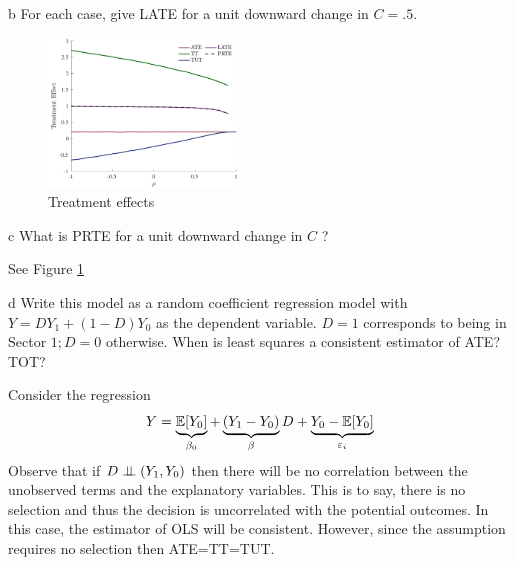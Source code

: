 \documentclass{article}
\begin{document}
\begin{problem}{b}
For each case, give LATE for a unit downward change in $C=.5$.
\end{problem}
\begin{solution}
\begin{figure}[htb]
    \centering
    \includegraphics[width=0.45\textwidth]{ps1Heckman/Figures/treatments.pdf}
    \caption{Treatment effects}
    \label{ps1H:q4:fig2}
\end{figure}\end{solution}
\begin{problem}{c}
What is PRTE for a unit downward change in $C$ ?
\end{problem}
\begin{solution}
See Figure \ref{ps1H:q4:fig2}
\end{solution}
\begin{problem}{d}
Write this model as a random coefficient regression model with $Y=D Y_{1}+(1-D) Y_{0}$ as the dependent variable. $D=1$ corresponds to being in Sector $1 ; D=0$ otherwise. When is least squares a consistent estimator of ATE? TOT?
\end{problem}
\begin{solution}
Consider the regression 
\begin{equation*}
    Y = \underbrace{\mathbb{E}[Y_0]}_{\beta_0} + \underbrace{(Y_1-Y_0)}_{\beta} D + \underbrace{Y_0-\mathbb{E}[Y_0]}_{\varepsilon_i}
\end{equation*}
Observe that if $D\perp\!\!\!\perp(Y_1,Y_0)$ then there will be no correlation between the unobserved terms and the explanatory variables. This is to say, there is no selection and thus the decision is uncorrelated with the potential outcomes. In this case, the estimator of OLS will be consistent. However, since the assumption requires no selection then ATE=TT=TUT. 
\end{solution}


\newpage
\end{document}
